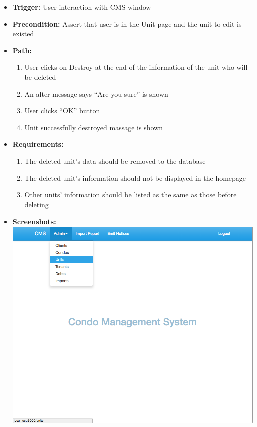 \begin{itemize}
  \item[] \textbf{Trigger:} User interaction with CMS window
  \item[] \textbf{Precondition:} Assert that user is in the Unit page and the unit to edit is existed
  \item[] \textbf{Path:}
    \begin{enumerate}
      \item User clicks on Destroy at the end of the information of the unit who will be deleted
      \item An alter message says ``Are you sure'' is shown
      \item User clicks ``OK'' button
      \item Unit successfully destroyed massage is shown
    \end{enumerate}
  \item[] \textbf{Requirements:}
    \begin{enumerate}
      \item The deleted unit’s data should be removed to the database
      \item The deleted unit’s information should not be displayed in the homepage
      \item Other units’ information should be listed as the same as those before deleting
    \end{enumerate}
  \item[] \textbf{Screenshots:}\\
    \includegraphics[scale=0.25]{./images/ss/unit/delete/1.png}

\end{itemize}

